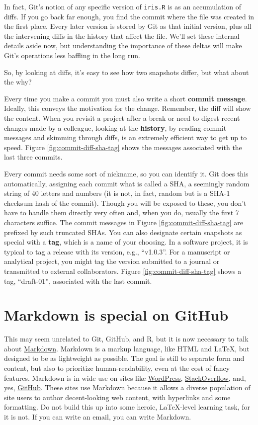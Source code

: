 \documentclass[12pt]{article}
\begin{document}
In fact, Git's notion of any specific version of \texttt{iris.R} is as
an accumulation of diffs. If you go back far enough, you find the commit
where the file was created in the first place. Every later version is
stored by Git as that initial version, plus all the intervening diffs in
the history that affect the file. We'll set these internal details aside
now, but understanding the importance of these deltas will make Git's
operations less baffling in the long run.

So, by looking at diffs, it's easy to see how two snapshots differ, but
what about the why?

Every time you make a commit you must also write a short \textbf{commit
message}. Ideally, this conveys the motivation for the change. Remember,
the diff will show the content. When you revisit a project after a break
or need to digest recent changes made by a colleague, looking at the
\textbf{history}, by reading commit messages and skimming through diffs,
is an extremely efficient way to get up to speed. Figure
\ref{fig:commit-diff-sha-tag} shows the messages associated with the
last three commits.

Every commit needs some sort of nickname, so you can identify it. Git
does this automatically, assigning each commit what is called a SHA, a
seemingly random string of 40 letters and numbers (it is not, in fact,
random but is a SHA-1 checksum hash of the commit). Though you will be
exposed to these, you don't have to handle them directly very often and,
when you do, usually the first 7 characters suffice. The commit messages
in Figure \ref{fig:commit-diff-sha-tag} are prefixed by such truncated
SHAs. You can also designate certain snapshots as special with a
\textbf{tag}, which is a name of your choosing. In a software project,
it is typical to tag a release with its version, e.g., ``v1.0.3''. For a
manuscript or analytical project, you might tag the version submitted to
a journal or transmitted to external collaborators. Figure
\ref{fig:commit-diff-sha-tag} shows a tag, ``draft-01'', associated with
the last commit.

\section{Markdown is special on
GitHub}\label{markdown-is-special-on-github}

This may seem unrelated to Git, GitHub, and R, but it is now necessary
to talk about
\href{https://daringfireball.net/projects/markdown/syntax}{Markdown}.
Markdown is a markup language, like HTML and LaTeX, but designed to be
as lightweight as possible. The goal is still to separate form and
content, but also to prioritize human-readability, even at the cost of
fancy features. Markdown is in wide use on sites like
\href{https://en.support.wordpress.com/markdown/}{WordPress},
\href{https://stackoverflow.com/editing-help}{StackOverflow}, and, yes,
\href{https://help.github.com/categories/writing-on-github/}{GitHub}.
These sites use Markdown because it allows a diverse population of site
users to author decent-looking web content, with hyperlinks and some
formatting. Do not build this up into some heroic, LaTeX-level learning
task, for it is not. If you can write an email, you can write Markdown.
\end{document}
